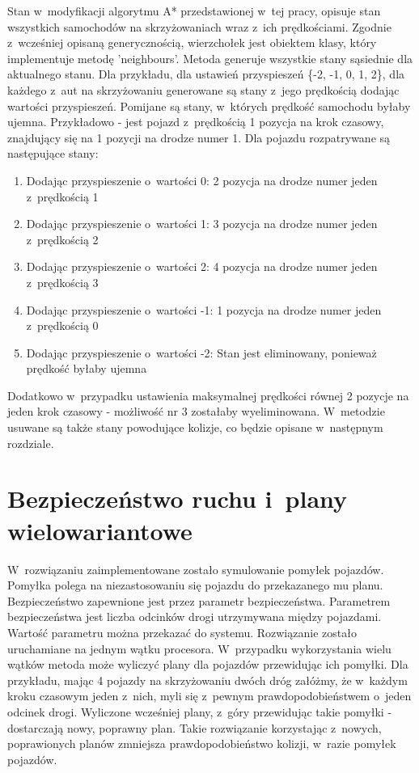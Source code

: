 Stan w~modyfikacji algorytmu A* przedstawionej w~tej pracy, opisuje stan wszystkich samochodów na skrzyżowaniach wraz z~ich prędkościami. Zgodnie z~wcześniej opisaną generycznością, wierzchołek jest obiektem klasy, który implementuje metodę 'neighbours'. Metoda generuje wszystkie stany sąsiednie dla aktualnego stanu. Dla przykładu, dla ustawień przyspieszeń \{-2, -1, 0, 1, 2\}, dla każdego z~aut na skrzyżowaniu generowane są stany z~jego prędkością dodając wartości przyspieszeń. Pomijane są stany, w~których prędkość samochodu byłaby ujemna. Przykładowo - jest pojazd z~prędkością 1 pozycja na krok czasowy, znajdujący się na 1 pozycji na drodze numer 1. Dla pojazdu rozpatrywane są następujące stany:
\begin{enumerate}
\item Dodając przyspieszenie o~wartości 0: 2 pozycja na drodze numer jeden z~prędkością 1
\item Dodając przyspieszenie o~wartości 1: 3 pozycja na drodze numer jeden z~prędkością 2
\item Dodając przyspieszenie o~wartości 2: 4 pozycja na drodze numer jeden z~prędkością 3
\item Dodając przyspieszenie o~wartości -1: 1 pozycja na drodze numer jeden z~prędkością 0
\item Dodając przyspieszenie o~wartości -2: Stan jest eliminowany, ponieważ prędkość byłaby ujemna
\end{enumerate}
Dodatkowo w~przypadku ustawienia maksymalnej prędkości równej 2 pozycje na jeden krok czasowy - możliwość nr 3 zostałaby wyeliminowana.
\newline
\newline
W~metodzie usuwane są także stany powodujące kolizje, co będzie opisane w~następnym rozdziale.

\section{Bezpieczeństwo ruchu i~plany wielowariantowe}

W~rozwiązaniu zaimplementowane zostało symulowanie pomyłek pojazdów. Pomyłka polega na niezastosowaniu się pojazdu do przekazanego mu planu. Bezpieczeństwo zapewnione jest przez parametr bezpieczeństwa. Parametrem bezpieczeństwa jest liczba odcinków drogi utrzymywana między pojazdami. Wartość parametru można przekazać do systemu.
\newline
\indent
Rozwiązanie zostało uruchamiane na jednym wątku procesora. W~przypadku wykorzystania wielu wątków metoda może wyliczyć plany dla pojazdów przewidując ich pomyłki. Dla przykładu, mając 4 pojazdy na skrzyżowaniu dwóch dróg załóżmy, że w~każdym kroku czasowym jeden z~nich, myli się z~pewnym prawdopodobieństwem  o~jeden odcinek drogi. Wyliczone wcześniej plany, z~góry przewidując takie pomyłki - dostarczają nowy, poprawny plan. Takie rozwiązanie korzystając z~nowych, poprawionych planów zmniejsza prawdopodobieństwo kolizji, w~razie pomyłek pojazdów.

